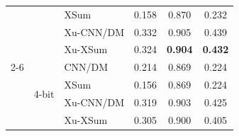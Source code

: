 \begin{table}[tbp]
\begin{tabular}{lllccc}
 &  & XSum & 0.158 & 0.870 & 0.232 \\
 &  & Xu-CNN/DM & 0.332 & 0.905 & 0.439 \\
 &  & Xu-XSum & 0.324 & \textbf{0.904} & \textbf{0.432} \\
\cmidrule(lr){2-6}
 & \multirow{4}{*}{4-bit} & CNN/DM & 0.214 & 0.869 & 0.224 \\
 &  & XSum & 0.156 & 0.869 & 0.224 \\
 &  & Xu-CNN/DM & 0.319 & 0.903 & 0.425 \\
 &  & Xu-XSum & 0.305 & 0.900 & 0.405 \\
\bottomrule
\end{tabular}
\end{table}